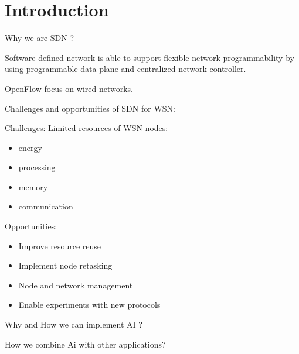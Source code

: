 \section{Introduction}

Why we are SDN ?

Software defined network is able to support flexible network programmability 
by using programmable data plane and centralized network controller.

OpenFlow focus on wired networks.

Challenges and opportunities of SDN for WSN:

Challenges: Limited resources of WSN nodes:
\begin{itemize}
\item	energy
\item	processing
\item	memory
\item	communication
\end{itemize}

Opportunities: 
\begin{itemize}
\item	Improve resource reuse
\item	Implement node retasking 
\item	Node and network management
\item	Enable experiments with new protocols
\end{itemize}








Why and How we can implement AI ?

How we combine Ai with other applications?
